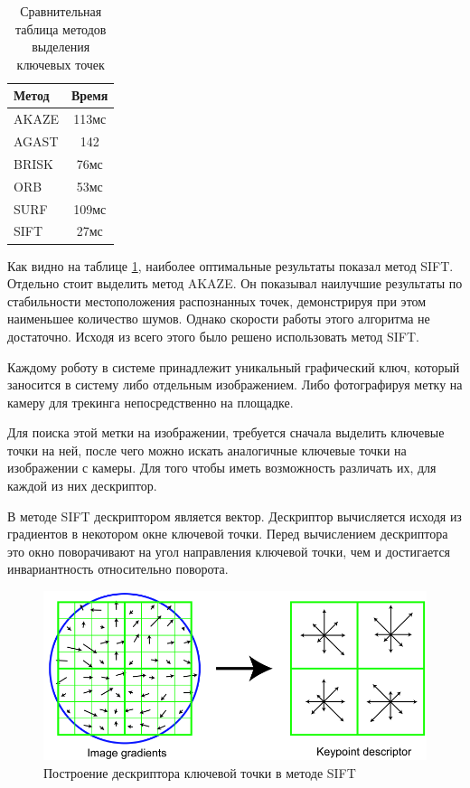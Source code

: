 \documentclass[a4paper,12pt]{article}
\begin{document}
\begin{table}[H]
    \centering
    \begin{tabular}{|p{5cm}|c|}
    \hline
    Метод & Время \\
    \hline
    AKAZE & 113мс \\
    \hline
    AGAST & 142 \\
    \hline
    BRISK & 76мс \\
    \hline
    ORB & 53мс \\
    \hline
    SURF & 109мс \\
    \hline
    SIFT & 27мс \\
    \hline
    \end{tabular}
    \caption{Сравнительная таблица методов выделения ключевых точек}
    \label{tab:kp_methods}
\end{table}

Как видно на таблице \ref{tab:kp_methods}, наиболее оптимальные результаты показал метод SIFT. Отдельно стоит выделить метод AKAZE. Он показывал наилучшие результаты по стабильности местоположения распознанных точек, демонстрируя при этом наименьшее количество шумов. Однако скорости работы этого алгоритма не достаточно. Исходя из всего этого было решено использовать метод SIFT.

Каждому роботу в системе принадлежит уникальный графический ключ, который заносится в систему либо отдельным изображением. Либо фотографируя метку на камеру для трекинга непосредственно на площадке.

Для поиска этой метки на изображении, требуется сначала выделить ключевые точки на ней, после чего можно искать аналогичные ключевые точки на изображении с камеры. Для того чтобы иметь возможность различать их, для каждой из них дескриптор.

В методе SIFT дескриптором является вектор. Дескриптор вычисляется исходя из градиентов в некотором окне ключевой точки. Перед вычислением дескриптора это окно поворачивают на угол направления ключевой точки, чем и достигается инвариантность относительно поворота. 

\begin{figure}[H]
    \centering
    \includegraphics[width=\textwidth]{pictures/SiftGradient.png}
    \caption{Построение дескриптора ключевой точки в методе SIFT}
    \label{fig:sift_gradient}
\end{figure}
\end{document}
